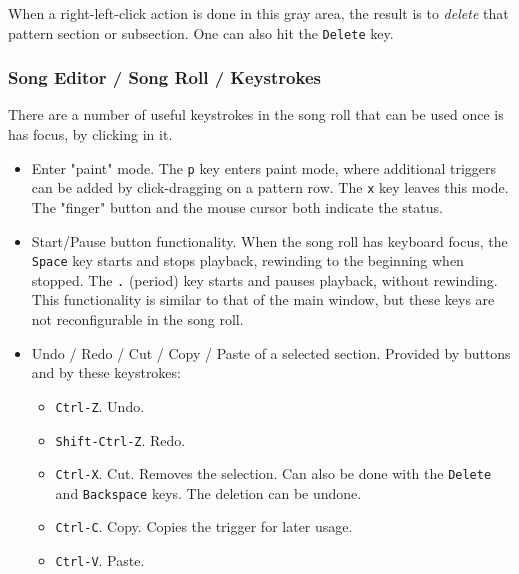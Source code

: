    When a right-left-click action is done in this gray area, the result
   is to \textsl{delete} that pattern section or subsection.
   One can also hit the \texttt{Delete} key.

\subsubsection{Song Editor / Song Roll / Keystrokes}
\label{subsubsec:song_editor_song_roll_keystrokes}

   There are a number of useful keystrokes in the song roll that can be used
   once is has focus, by clicking in it.

   \begin{itemize}
      \item Enter "paint" mode.
         The \texttt{p} key enters paint mode, where additional triggers
         can be added by click-dragging on a pattern row.
         The \texttt{x} key leaves this mode.
         The "finger" button and the mouse cursor both indicate the status.
      \item Start/Pause button functionality.
         When the song roll has keyboard focus,
         the \texttt{Space} key starts and stops playback, rewinding to the
         beginning when stopped.
         The \texttt{.} (period) key starts and pauses playback, without
         rewinding.
         This functionality is similar to that of the main window, but
         these keys are not reconfigurable in the song roll.
      \item Undo / Redo / Cut / Copy / Paste of a selected section.
         Provided by buttons and by these keystrokes:
         \begin{itemize}
            \item \texttt{Ctrl-Z}. Undo.
            \item \texttt{Shift-Ctrl-Z}. Redo.
            \item \texttt{Ctrl-X}. Cut.  Removes the selection.
            Can also be done with the \texttt{Delete} and
            \texttt{Backspace} keys.
            The deletion can be undone.
            \item \texttt{Ctrl-C}. Copy.
            Copies the trigger for later usage.
            \item \texttt{Ctrl-V}. Paste.

\end{itemize}
\end{itemize}
